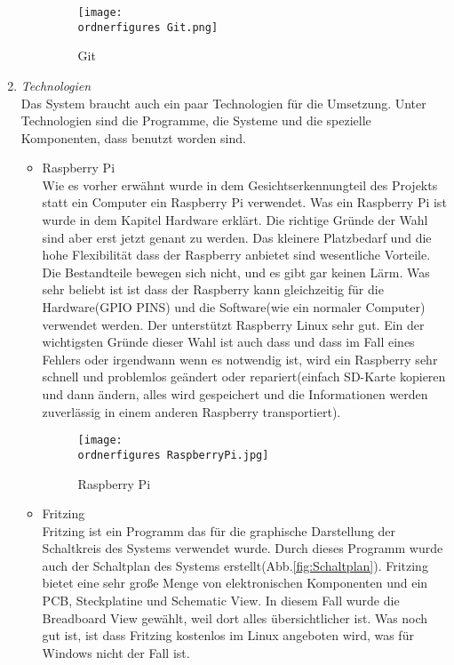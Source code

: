 \begin{enumerate}
\begin{itemize}
			\begin{figure}[H]
				\texttt{[image: \\ordnerfigures Git.png]}
				\centering
				\caption{Git}
			\end{figure}\cite{GitBild}
		\end{itemize}
	\item \textit{Technologien} \\
	Das System braucht auch ein paar Technologien für die Umsetzung. Unter Technologien sind die Programme, die Systeme und die spezielle Komponenten, dass benutzt worden sind.
		\begin{itemize}
			\item Raspberry Pi \\
			Wie es vorher erwähnt wurde in dem Gesichtserkennungteil des Projekts statt ein Computer ein Raspberry Pi verwendet. Was ein Raspberry Pi ist wurde in dem Kapitel Hardware erklärt. Die richtige Gründe der Wahl sind aber erst jetzt genant zu werden. Das kleinere Platzbedarf und die hohe Flexibilität dass der Raspberry anbietet sind wesentliche Vorteile. Die Bestandteile bewegen sich nicht, und es gibt gar keinen Lärm. Was sehr beliebt ist ist dass der Raspberry kann gleichzeitig für die Hardware(GPIO PINS) und die Software(wie ein normaler Computer) verwendet werden. Der unterstützt Raspberry Linux sehr gut. Ein der wichtigsten Gründe dieser Wahl ist auch dass  und dass im Fall eines Fehlers oder irgendwann wenn es notwendig ist, wird ein Raspberry sehr schnell und problemlos geändert oder repariert(einfach SD-Karte kopieren und dann ändern, alles wird gespeichert und die Informationen werden zuverlässig in einem anderen Raspberry transportiert).
			\begin{figure}[H]
				\texttt{[image: \\ordnerfigures RaspberryPi.jpg]}
				\centering
				\caption{Raspberry Pi}
			\end{figure}\cite{RaspberryBild}
			\item Fritzing \\
			Fritzing ist ein Programm das für die graphische Darstellung der Schaltkreis des Systems verwendet wurde. Durch dieses Programm wurde auch der Schaltplan des Systems erstellt(Abb.\ref{fig:Schaltplan}). Fritzing bietet eine sehr große Menge von elektronischen Komponenten und ein PCB, Steckplatine und Schematic View. In diesem Fall wurde die Breadboard View gewählt, weil dort alles übersichtlicher ist. Was noch gut ist, ist dass Fritzing kostenlos im Linux angeboten wird, was für Windows nicht der Fall ist.
			\begin{figure}[H]

\end{figure}
\end{itemize}
\end{enumerate}
